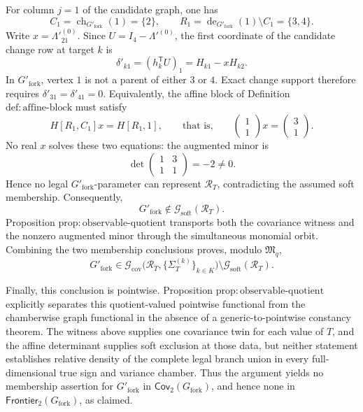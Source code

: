 For column \(j=1\) of the candidate graph, one has
\[
 C_1=\operatorname{ch}_{G'_{\mathrm{fork}}}(1)=\{2\},
 \qquad
 R_1=\operatorname{de}_{G'_{\mathrm{fork}}}(1)\setminus C_1=\{3,4\}.
\]
Write \(x=\Lambda'^{(0)}_{21}\).  Since \(U=I_4-\Lambda'^{(0)}\), the first coordinate of the candidate change row at target \(k\) is
\[
 \delta'_{k1}=(h_k^{\mathsf T}U)_1=H_{k1}-xH_{k2}.
\]
In \(G'_{\mathrm{fork}}\), vertex \(1\) is not a parent of either \(3\) or \(4\).  Exact change support therefore requires \(\delta'_{31}=\delta'_{41}=0\).  Equivalently, the affine block of Definition \(\mathrm{def{:}affine\text{-}block}\) must satisfy
\[
 H[R_1,C_1]x=H[R_1,1],
 \qquad\text{that is,}\qquad
 \begin{pmatrix}1\\1\end{pmatrix}x
 =\begin{pmatrix}3\\1\end{pmatrix}.
\]
No real \(x\) solves these two equations: the augmented minor is
\[
 \det\begin{pmatrix}1&3\\1&1\end{pmatrix}=-2\ne0.
\]
Hence no legal \(G'_{\mathrm{fork}}\)-parameter can represent \(\mathcal R_T\), contradicting the assumed soft membership.  Consequently,
\[
 G'_{\mathrm{fork}}\notin\mathcal G_{\mathrm{soft}}(\mathcal R_T).
\]
Proposition \(\mathrm{prop{:}observable\text{-}quotient}\) transports both the covariance witness and the nonzero augmented minor through the simultaneous monomial orbit.  Combining the two membership conclusions proves, modulo \(\mathfrak M_q\),
\[
 G'_{\mathrm{fork}}\in
 \mathcal G_{\mathrm{cov}}
 \bigl(\mathcal R_T,\{\Sigma_T^{(k)}\}_{k\in K}\bigr)
 \setminus\mathcal G_{\mathrm{soft}}(\mathcal R_T).
\]

Finally, this conclusion is pointwise.  Proposition \(\mathrm{prop{:}observable\text{-}quotient}\) explicitly separates this quotient-valued pointwise functional from the chamberwise graph functional in the absence of a generic-to-pointwise constancy theorem.  The witness above supplies one covariance twin for each value of \(T\), and the affine determinant supplies soft exclusion at those data, but neither statement establishes relative density of the complete legal branch union in every full-dimensional true sign and variance chamber.  Thus the argument yields no membership assertion for \(G'_{\mathrm{fork}}\) in \(\mathsf{Cov}_2(G_{\mathrm{fork}})\), and hence none in \(\mathsf{Frontier}_2(G_{\mathrm{fork}})\), as claimed.
